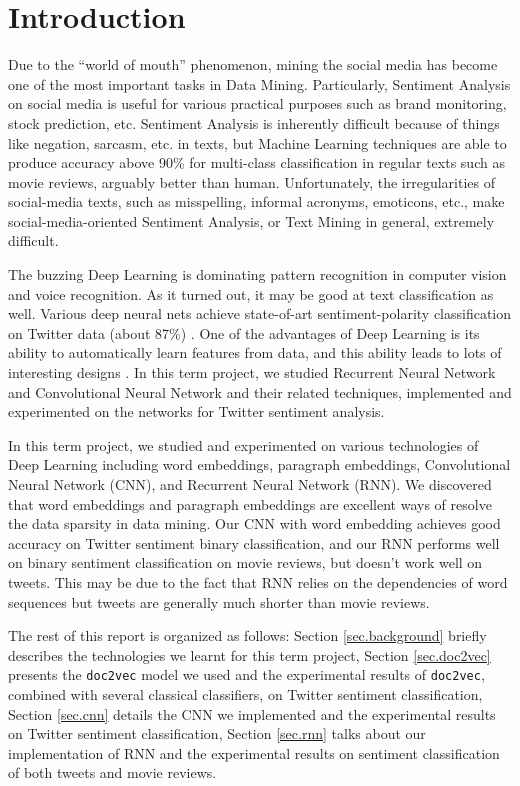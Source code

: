 \section{Introduction}

Due to the ``world of mouth'' phenomenon, mining the social media has become one of the most important tasks in Data Mining. Particularly, Sentiment Analysis on social media is useful for various practical purposes such as brand monitoring, stock prediction, etc. Sentiment Analysis is inherently difficult because of things like negation, sarcasm, etc. in texts, but Machine Learning techniques are able to produce accuracy above 90\% for multi-class classification in regular texts such as movie reviews, arguably better than human. Unfortunately, the irregularities of social-media texts, such as misspelling, informal acronyms, emoticons, etc., make social-media-oriented Sentiment Analysis, or Text Mining in general, extremely difficult. 

The buzzing Deep Learning is dominating pattern recognition in computer vision and voice recognition. As it turned out, it may be good at text classification as well. Various deep neural nets achieve state-of-art sentiment-polarity classification on Twitter data (about 87\%) \cite{kalchbrenner2014, kim2014, wang2015}. One of the advantages of Deep Learning is its ability to automatically learn features from data, and this ability leads to lots of interesting designs \cite{dos2014, kalchbrenner2014, kim2014, socher2013, wang2015}. In this term project, we studied Recurrent Neural Network and Convolutional Neural Network and their related techniques, implemented and experimented on the networks for Twitter sentiment analysis. 

In this term project, we studied and experimented on various technologies of Deep Learning including word embeddings, paragraph embeddings, Convolutional Neural Network (CNN), and Recurrent Neural Network (RNN). We discovered that word embeddings and paragraph embeddings are excellent ways of resolve the data sparsity in data mining. Our CNN with word embedding achieves good accuracy on Twitter sentiment binary classification, and our RNN performs well on binary sentiment classification on movie reviews, but doesn't work well on tweets. This may be due to the fact that RNN relies on the dependencies of word sequences but tweets are generally much shorter than movie reviews. 

The rest of this report is organized as follows: Section \ref{sec.background} briefly describes the technologies we learnt for this term project, Section \ref{sec.doc2vec} presents the {\tt doc2vec} model we used and the experimental results of {\tt doc2vec}, combined with several classical classifiers, on Twitter sentiment classification, Section \ref{sec.cnn} details the CNN we implemented and the experimental results on Twitter sentiment classification, Section \ref{sec.rnn} talks about our implementation of RNN and the experimental results on sentiment classification of both tweets and movie reviews. 
